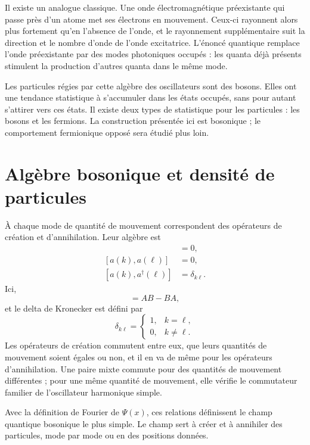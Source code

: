Il existe un analogue classique. Une onde électromagnétique préexistante qui passe près d’un atome met ses électrons en mouvement. Ceux-ci rayonnent alors plus fortement qu’en l’absence de l’onde, et le rayonnement supplémentaire suit la direction et le nombre d’onde de l’onde excitatrice. L’énoncé quantique remplace l’onde préexistante par des modes photoniques occupés : les quanta déjà présents stimulent la production d’autres quanta dans le même mode.

Les particules régies par cette algèbre des oscillateurs sont des bosons. Elles ont une tendance statistique à s’accumuler dans les états occupés, sans pour autant s’attirer vers ces états. Il existe deux types de statistique pour les particules : les bosons et les fermions. La construction présentée ici est bosonique ; le comportement fermionique opposé sera étudié plus loin.

\section{Algèbre bosonique et densité de particules}

À chaque mode de quantité de mouvement correspondent des opérateurs de création et d’annihilation. Leur algèbre est
\begin{align}
[a^\dagger(k),a^\dagger(\ell)]&=0,\\
[a(k),a(\ell)]&=0,\\
[a(k),a^\dagger(\ell)]&=\delta_{k\ell}.
\end{align}
Ici,
\begin{equation}
[A,B]=AB-BA,
\end{equation}
et le delta de Kronecker est défini par
\begin{equation}
\delta_{k\ell}=
\begin{cases}
1,&k=\ell,\\
0,&k\ne\ell.
\end{cases}
\end{equation}
Les opérateurs de création commutent entre eux, que leurs quantités de mouvement soient égales ou non, et il en va de même pour les opérateurs d’annihilation. Une paire mixte commute pour des quantités de mouvement différentes ; pour une même quantité de mouvement, elle vérifie le commutateur familier de l’oscillateur harmonique simple.

Avec la définition de Fourier de \(\Psi(x)\), ces relations définissent le champ quantique bosonique le plus simple. Le champ sert à créer et à annihiler des particules, mode par mode ou en des positions données.

